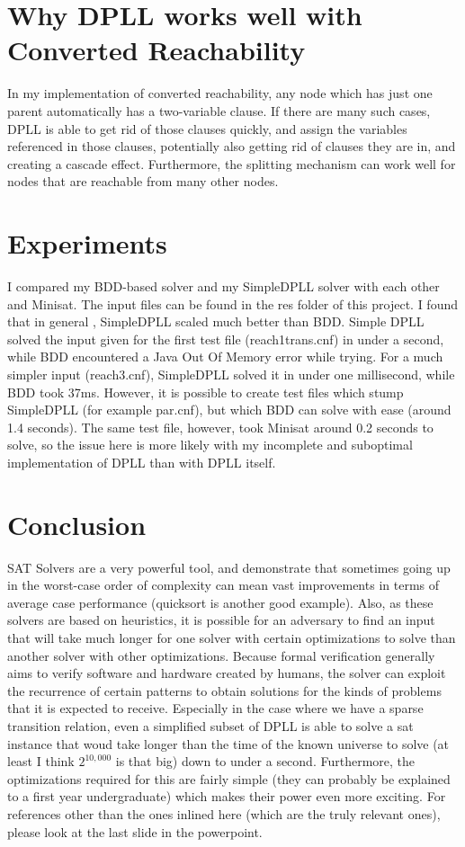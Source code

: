 \documentclass[11pt]{article}
\begin{document}
\begin{flushleft}
\section{Why DPLL works well with Converted Reachability} In my implementation of converted reachability, any node which has just one parent automatically has a two-variable clause. If there are many such cases, DPLL is able to get rid of those clauses quickly, and assign the variables referenced in those clauses, potentially also getting rid of clauses they are in, and creating a cascade effect. Furthermore, the splitting mechanism can work well for nodes that are reachable from many other nodes.

\section{Experiments}
I compared my BDD-based solver and my SimpleDPLL solver with each other and Minisat. The input files can be found in the res folder of this project. I found that in general , SimpleDPLL scaled much better than BDD. Simple DPLL solved the input given for the first test file (reach1trans.cnf) in under a second, while BDD encountered a Java Out Of Memory error while trying. For a much simpler input (reach3.cnf), SimpleDPLL solved it in under one millisecond, while BDD took 37ms.  However, it is possible to create test files which stump SimpleDPLL (for example par.cnf), but which BDD can solve with ease (around 1.4 seconds). The same test file, however, took Minisat around 0.2 seconds to solve, so the issue here is more likely with my incomplete and suboptimal implementation of DPLL than with DPLL itself.
\section{Conclusion} SAT Solvers are a very powerful tool, and demonstrate that sometimes going up in the worst-case order of complexity can mean vast improvements in terms of average case performance (quicksort is another good example). Also, as these solvers are based on heuristics, it is possible for an adversary to find an input that will take much longer for one solver with certain optimizations to solve than another solver with other optimizations. Because formal verification generally aims to verify software and hardware created by humans, the solver can exploit the recurrence of certain patterns to obtain solutions for the kinds of problems that it is expected to receive. Especially in the case where we have a sparse transition relation, even a simplified subset of DPLL is able to solve a sat instance that woud take longer than the time of the known universe to solve (at least I think $2^{10,000}$ is that big) down to under a second. Furthermore, the optimizations required for this are fairly simple (they can probably be explained to a first year undergraduate) which makes their power even more exciting. For references other than the ones inlined here (which are the truly relevant ones), please look at the last slide in the powerpoint.
\end{flushleft}
\end{document}
